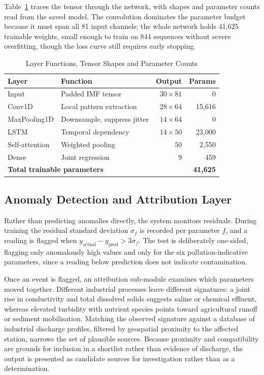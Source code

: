 \documentclass[conference]{IEEEtran}
\begin{document}
Table~\ref{tab:shapes} traces the tensor through the network, with shapes and
parameter counts read from the saved model. The convolution dominates the
parameter budget because it must span all 81 input channels; the whole network
holds 41{,}625 trainable weights, small enough to train on 844 sequences
without severe overfitting, though the loss curve still requires early
stopping.

\begin{table}[!t]
\caption{Layer Functions, Tensor Shapes and Parameter Counts}
\label{tab:shapes}
\centering
\small
\setlength{\tabcolsep}{3.5pt}
\begin{tabular}{llrr}
\toprule
\textbf{Layer} & \textbf{Function} & \textbf{Output} & \textbf{Params} \\
\midrule
Input          & Padded IMF tensor      & $30\times81$ & 0 \\
Conv1D         & Local pattern extraction & $28\times64$ & 15{,}616 \\
MaxPooling1D   & Downsample, suppress jitter & $14\times64$ & 0 \\
LSTM           & Temporal dependency    & $14\times50$ & 23{,}000 \\
Self-attention & Weighted pooling       & $50$         & 2{,}550 \\
Dense          & Joint regression       & $9$          & 459 \\
\midrule
\multicolumn{3}{l}{\textbf{Total trainable parameters}} & \textbf{41{,}625} \\
\bottomrule
\end{tabular}
\end{table}

\subsection{Anomaly Detection and Attribution Layer}

Rather than predicting anomalies directly, the system monitors residuals.
During training the residual standard deviation $\sigma_f$ is recorded per
parameter $f$, and a reading is flagged when
$y_{\text{actual}} - y_{\text{pred}} > 3\sigma_f$. The test is deliberately
one-sided, flagging only anomalously high values and only for the six
pollution-indicative parameters, since a reading below prediction does not
indicate contamination.

Once an event is flagged, an attribution sub-module examines which parameters
moved together. Different industrial processes leave different signatures: a
joint rise in conductivity and total dissolved solids suggests saline or
chemical effluent, whereas elevated turbidity with nutrient species points
toward agricultural runoff or sediment mobilisation. Matching the observed
signature against a database of industrial discharge profiles, filtered by
geospatial proximity to the affected station, narrows the set of plausible
sources. Because proximity and compatibility are grounds for inclusion in a
shortlist rather than evidence of discharge, the output is presented as
candidate sources for investigation rather than as a determination.
\end{document}
